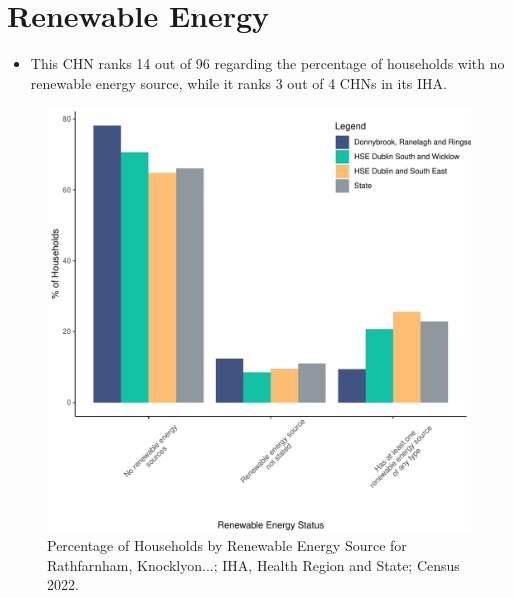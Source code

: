 \documentclass{article}
\begin{document}
\section{Renewable Energy}\label{sect:RE}
\begin{itemize}
\item This CHN ranks  14 out of 96 regarding the percentage of households with no renewable energy source, while it ranks   3 out of 4 CHNs in its IHA.
\end{itemize}
\begin{figure}[H]
	\centering
	\includegraphics[width = 140mm]{../figures/RenewableEnergyED.pdf}
	\caption{Percentage of Households by Renewable Energy Source for Rathfarnham, Knocklyon...; IHA, Health Region and State; Census 2022.}
	\label{fig:vbnv}
	\end{figure}
\end{document}
